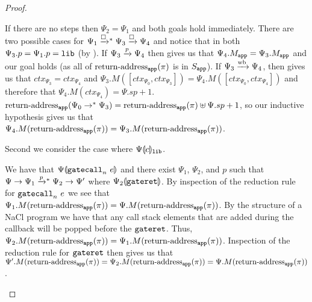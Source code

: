 \begin{proof}
\begin{itemize}
    \begin{subproof}
      If there are no steps then $\Psi_2 = \Psi_1$ and both goals hold immediately.
      There are two possible cases for $\Psi_1 \stepboxstar \Psi_3 \stepbox \Psi_4$ and notice that in both $\Psi_3.p = \Psi_1.p = \mathtt{lib}$ (by ).
      If $\Psi_3 \mathrel{\xrightarrow{p}} \Psi_4$ then  gives us that $\Psi_4.M_{\mathtt{app}} = \Psi_3.M_{\mathtt{app}}$ and our goal holds (as all of $\operatorname{return-address}_{\mathtt{app}}(\pi)$ is in $S_{\mathtt{app}}$).
      If $\Psi_3 \mathrel{\xrightarrow{\!\text{wb}}} \Psi_4$, then  gives us that $ctx_{\Psi_3} = ctx_{\Psi_4}$ and $\Psi_3.M([ctx_{\Psi_0}, ctx_{\Psi_3}]) = \Psi_4.M([ctx_{\Psi_0}, ctx_{\Psi_4}])$ and therefore that $\Psi_4.M(ctx_{\Psi_4}) = \Psi.sp + 1$.
      $\operatorname{return-address}_{\mathtt{app}}(\Psi_0 \mathrel{\mathrel{\rightarrow}^{\ast}} \Psi_3) = \operatorname{return-address}_{\mathtt{app}}(\pi) \uplus \Psi.sp + 1$, so our inductive hypothesis gives us that $\Psi_4.M(\operatorname{return-address}_{\mathtt{app}}(\pi)) = \Psi_3.M(\operatorname{return-address}_{\mathtt{app}}(\pi))$.
    \end{subproof}
  \end{itemize}

  Second we consider the case where ${\Psi}\llparenthesis{c}\rrparenthesis_{\mathtt{lib}}$.
  \begin{itemize}

    We have that ${\Psi}\llparenthesis{\ensuremath{\mathtt{gatecall}_{n}\ {e}}}\rrparenthesis$ and there exist $\Psi_1$, $\Psi_2$, and $p$ such that $\Psi \step \Psi_1 \steppstar{p} \Psi_2 \step \Psi'$ where ${\Psi_2}\llparenthesis{\ensuremath{\mathtt{gateret}}}\rrparenthesis$.
    By inspection of the reduction rule for $\mathtt{gatecall}_{n}\ {e}$ we see that $\Psi_1.M(\operatorname{return-address}_{\mathtt{app}}(\pi)) = \Psi.M(\operatorname{return-address}_{\mathtt{app}}(\pi))$.
    By the structure of a NaCl program we have that any call stack elements that are added during the callback will be popped before the $\mathtt{gateret}$.
    Thus, $\Psi_2.M(\operatorname{return-address}_{\mathtt{app}}(\pi)) = \Psi_1.M(\operatorname{return-address}_{\mathtt{app}}(\pi))$.
    Inspection of the reduction rule for $\mathtt{gateret}$ then gives us that $\Psi'.M(\operatorname{return-address}_{\mathtt{app}}(\pi)) = \Psi_2.M(\operatorname{return-address}_{\mathtt{app}}(\pi)) = \Psi.M(\operatorname{return-address}_{\mathtt{app}}(\pi))$.



\end{itemize}
\end{proof}
